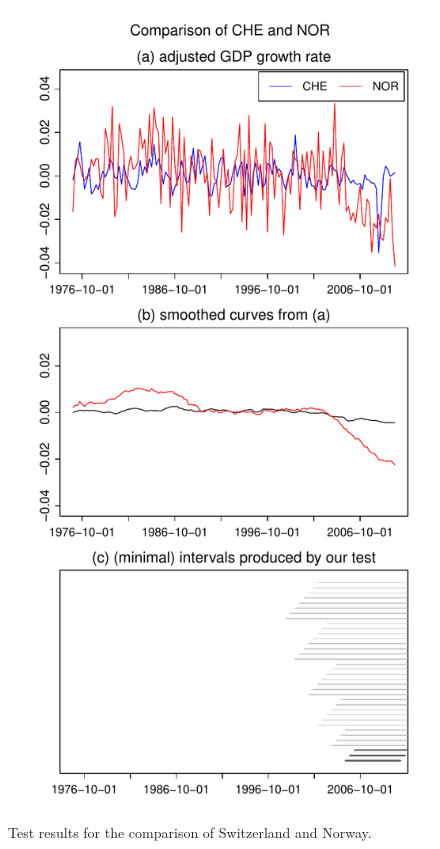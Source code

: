 \documentclass[a4paper,12pt]{article}
\begin{document}
\begin{figure}[t!]
\begin{minipage}[t]{0.49\textwidth}
\includegraphics[width=\textwidth]{Plots/CHE_vs_NOR}
\caption{Test results for the comparison of Switzerland and Norway.}\label{fig:Switzerland:Norway}
\end{minipage}
\hspace{0.25cm}

\end{figure}
\end{document}
